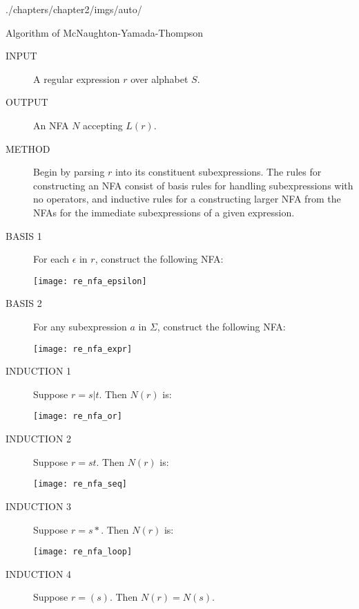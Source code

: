 \begin{graphicspathcontext}{{./chapters/chapter2/imgs/auto/}}
\begin{bibunit}[apalike]
\begin{frame}{Algorithm of McNaughton-Yamada-Thompson}
	\begin{description}
	\item[INPUT] A regular expression $r$ over alphabet $S$.
	\item[OUTPUT] An NFA $N$ accepting $L(r)$.
	\item[METHOD] Begin by parsing $r$ into its constituent subexpressions. The rules for constructing an NFA consist of basis rules for handling subexpressions with no operators, and inductive rules for a constructing larger NFA from the NFAs for the immediate subexpressions of a given expression.
	\vspace{1em}
	\item[BASIS 1] For each $\epsilon$ in $r$, construct the following NFA:
				\begin{center}
				\texttt{[image: re\_nfa\_epsilon]}
				\end{center}
	\item[BASIS 2] For any subexpression $a$ in $\Sigma$, construct the following NFA:
				\begin{center}
				\texttt{[image: re\_nfa\_expr]}
				\end{center}
	\item[INDUCTION 1] Suppose $r = s|t$. Then $N(r)$ is:
			\begin{center}
				\texttt{[image: re\_nfa\_or]}
			\end{center}
	\vspace{1em}
	\item[INDUCTION 2] Suppose $r = st$. Then $N(r)$ is:
		\begin{center}
			\texttt{[image: re\_nfa\_seq]}
		\end{center}
	\item[INDUCTION 3] Suppose $r = s*$. Then $N(r)$ is:
		\begin{center}
			\texttt{[image: re\_nfa\_loop]}
		\end{center}
	\vspace{1em}
	\item[INDUCTION 4] Suppose $r = (s)$. Then $N(r)=N(s)$.
	\end{description}
\end{frame}


\end{bibunit}
\end{graphicspathcontext}
